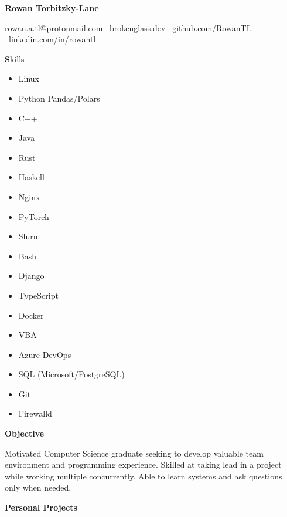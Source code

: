 \documentclass[12pt]{article}
\begin{document}
\begin{center}
    \textbf{\huge Rowan Torbitzky-Lane}\\
    \hrulefill
\end{center}

\begin{center}
    rowan.a.tl@protonmail.com \textbullet \ brokenglass.dev \textbullet \ github.com/RowanTL
    \textbullet \ linkedin.com/in/rowantl
\end{center}


\begin{center}
    \textbf Skills
\end{center}

\begin{multicols}{3}
\begin{itemize}[noitemsep]
 \item Linux
 \item Python Pandas/Polars
 \item C++
 \item Java
 \item Rust
 \item Haskell
 \item Nginx
 \item PyTorch
 \item Slurm
 \item Bash
 \item Django
 \item TypeScript
 \item Docker
 \item VBA
 \item Azure DevOps
 \item SQL (Microsoft/PostgreSQL)
 \item Git
 \item Firewalld
\end{itemize}
\end{multicols}

\begin{center}
    \textbf{Objective}
\end{center}
Motivated Computer Science graduate seeking to develop valuable team environment and programming experience. Skilled at taking lead in a project while working multiple concurrently. Able to learn systems and ask questions only when needed.

\begin{center}
    \textbf{Personal Projects}
\end{center}
\end{document}
